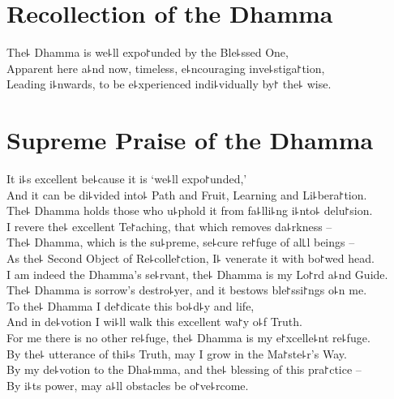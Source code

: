 \clearpage

\chapter{Recollection of the Dhamma}%

\begin{leader}
\end{leader}

The꜕ Dhamma is we꜕ll expo꜓unded by the Ble꜕ssed One,\\
Apparent here a꜕nd now, timeless, e꜕ncouraging inve꜕stiga꜓tion,\\
Leading i꜕nwards, to be e꜕xperienced indi꜕vidually by꜓ the꜕ wise.

\chapter{Supreme Praise of the Dhamma}%

\begin{leader}
\end{leader}

It i꜕s excellent be꜕cause it is `we꜕ll expo꜓unded,'\\
And it can be di꜕vided into꜕ Path and Fruit, Learning and Li꜕bera꜓tion.\\
The꜕ Dhamma holds those who u꜕phold it from fa꜕lli꜕ng i꜕nto꜕ delu꜓sion.\\
I revere the꜕ excellent Te꜓aching, that which removes da꜕rkness --\\
The꜕ Dhamma, which is the su꜕preme, se꜕cure re꜓fuge of al꜖l beings --\\
As the꜕ Second Object of Re꜕colle꜓ction, I꜕ venerate it with bo꜓wed head.\\
I am indeed the Dhamma's se꜕rvant, the꜕ Dhamma is my Lo꜓rd a꜕nd Guide.\\
The꜕ Dhamma is sorrow's destro꜕yer, and it bestows ble꜓ssi꜓ngs o꜕n me.\\
To the꜕ Dhamma I de꜓dicate this bo꜕d꜕y and life,\\
And in de꜕votion I wi꜕ll walk this excellent wa꜓y o꜕f Truth.\\
For me there is no other re꜕fuge, the꜕ Dhamma is my e꜓xcelle꜕nt re꜕fuge.\\
By the꜕ utterance of thi꜕s Truth, may I grow in the Ma꜓ste꜕r's Way.\\
By my de꜕votion to the Dha꜕mma, and the꜕ blessing of this pra꜓ctice --\\
By i꜕ts power, may a꜕ll obstacles be o꜓ve꜕rcome.

